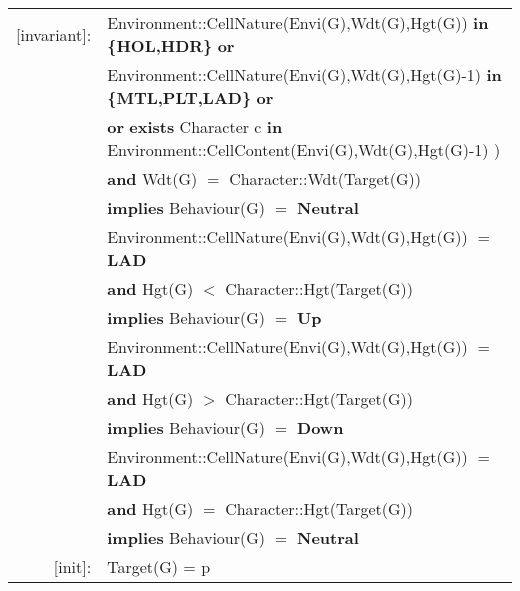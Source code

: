 \documentclass{article}
\begin{document}
\begin{tabular}{rl}
\textrm{[invariant]}: 
& \textrm{Environment::CellNature(Envi(G),Wdt(G),Hgt(G))} \textbf{in} \textbf{ \{HOL,HDR\}} \textbf{or}  \\

& \quad \textrm{Environment::CellNature(Envi(G),Wdt(G),Hgt(G)-1)} \textbf{in} \textbf{\{MTL,PLT,LAD\}} \textbf{or}  \\

& \quad \textbf{or} \textbf{exists} \textrm{Character} c \textbf{in} \textrm{Environment::CellContent(Envi(G),Wdt(G),Hgt(G)-1)} ) \\\

& \quad\quad \textbf{and} \textrm{Wdt(G)} $=$ \textrm{Character::Wdt(Target(G))} \\

& \quad\quad \textbf{implies} \textrm{Behaviour(G)} $=$ \textbf{Neutral} \\

& \textrm{Environment::CellNature(Envi(G),Wdt(G),Hgt(G))} $=$ \textbf{LAD} \\
& \quad \textbf{and}  \textrm{Hgt(G)} $<$ \textrm{Character::Hgt(Target(G))} \\
& \quad \textbf{implies} \textrm{Behaviour(G)} $=$ \textbf{Up} \\

& \textrm{Environment::CellNature(Envi(G),Wdt(G),Hgt(G))} $=$ \textbf{LAD} \\
& \quad
\textbf{and}  \textrm{Hgt(G)} $>$ \textrm{Character::Hgt(Target(G))} \\
& \quad \textbf{implies} \textrm{Behaviour(G)} $=$ \textbf{Down} \\

& \textrm{Environment::CellNature(Envi(G),Wdt(G),Hgt(G))} $=$ \textbf{LAD}  \\
& \quad
\textbf{and}  \textrm{Hgt(G)} $=$ \textrm{Character::Hgt(Target(G))} \\
& \quad \textbf{implies} \textrm{Behaviour(G)} $=$ \textbf{Neutral} \\

\textrm{[init]}:
& \textrm{Target(G)} = \textrm{p}\\


\end{tabular}
\end{document}
